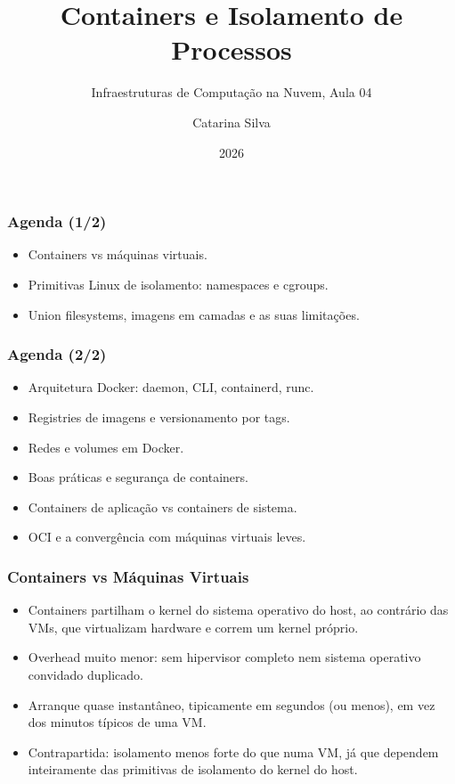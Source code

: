 \documentclass[aspectratio=169]{beamer}
\title{Containers e Isolamento de Processos}
\subtitle{Infraestruturas de Computação na Nuvem, Aula 04}
\author{Catarina Silva}
\institute{ESTGA, Universidade de Aveiro}
\date{2026}
\begin{document}
\begin{frame}[plain]
  \titlepage
\end{frame}

\begin{frame}
\frametitle{Agenda \textcolor{NudeTaupe}{\small(1/2)}}
\begin{itemize}
    \setlength\itemsep{0.4cm}
    \item Containers vs máquinas virtuais.
    \item Primitivas Linux de isolamento: namespaces e cgroups.
    \item Union filesystems, imagens em camadas e as suas limitações.
\end{itemize}
\end{frame}

\begin{frame}
\frametitle{Agenda \textcolor{NudeTaupe}{\small(2/2)}}
\begin{itemize}
    \setlength\itemsep{0.4cm}
    \item Arquitetura Docker: daemon, CLI, containerd, runc.
    \item Registries de imagens e versionamento por tags.
    \item Redes e volumes em Docker.
    \item Boas práticas e segurança de containers.
    \item Containers de aplicação vs containers de sistema.
    \item OCI e a convergência com máquinas virtuais leves.
\end{itemize}
\end{frame}

\begin{frame}
\frametitle{Containers vs Máquinas Virtuais}
\begin{itemize}
    \setlength\itemsep{0.4cm}
    \item Containers partilham o kernel do sistema operativo do host, ao contrário das VMs, que virtualizam hardware e correm um kernel próprio.
    \item Overhead muito menor: sem hipervisor completo nem sistema operativo convidado duplicado.
    \item Arranque quase instantâneo, tipicamente em segundos (ou menos), em vez dos minutos típicos de uma VM.
    \item Contrapartida: isolamento menos forte do que numa VM, já que dependem inteiramente das primitivas de isolamento do kernel do host.
\end{itemize}
\end{frame}
\end{document}
